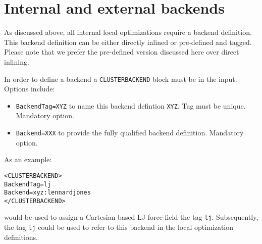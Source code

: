 \documentclass[a4paper,10pt]{scrbook}
\begin{document}


\section{Internal and external backends}
As discussed above, all internal local optimizations require a backend 
definition. This backend definition can be
either directly inlined or pre-defined and tagged. Please note that we prefer 
the pre-defined version discussed
here over direct inlining.

In order to define a backend a \texttt{CLUSTERBACKEND} block must be in the 
input. Options include:
\begin{itemize}
 \item \texttt{BackendTag=XYZ} to name this backend defintion \texttt{XYZ}. Tag 
must be unique. Mandatory option.
 \item \texttt{Backend=XXX} to provide the fully qualified backend definition. 
Mandatory option.
\end{itemize}

As an example:
\begin{verbatim}
<CLUSTERBACKEND>
BackendTag=lj
Backend=xyz:lennardjones
</CLUSTERBACKEND>
\end{verbatim}
would be used to assign a Cartesian-based LJ force-field the tag \texttt{lj}. 
Subsequently, the tag \texttt{lj}
could be used to refer to this backend in the local optimization definitions.
\end{document}
